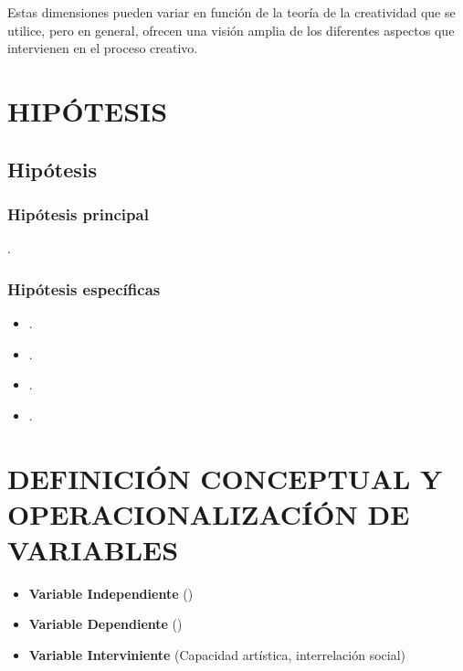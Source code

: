 \documentclass[12pt,a4paper]{article}
\begin{document}
Estas dimensiones pueden variar en función de la teoría de la creatividad que se utilice, pero en general, ofrecen una visión amplia de los diferentes aspectos que intervienen en el proceso creativo.





\flushbottom \printglossary[numberedsection,nonumberlist,title=Definiciones  de términos básicos]




\section{HIPÓTESIS}
\subsection{Hipótesis}
\subsubsection{Hipótesis principal}
\hipotesis.
\subsubsection{Hipótesis específicas}
\begin{itemize}
	\item \hipotesise.
	\item \hipotesisee.
	\item \hipotesiseee.
	\item \hipotesiseeee.
\end{itemize}

\section{DEFINICIÓN CONCEPTUAL Y OPERACIONALIZACÍÓN DE VARIABLES }
\begin{itemize}
	\item \textbf{Variable Independiente} (\variablei)
	\item \textbf{Variable Dependiente} (\variabled)
	\item \textbf{Variable Interviniente} (Capacidad artística, interrelación social)
\end{itemize}
\end{document}
